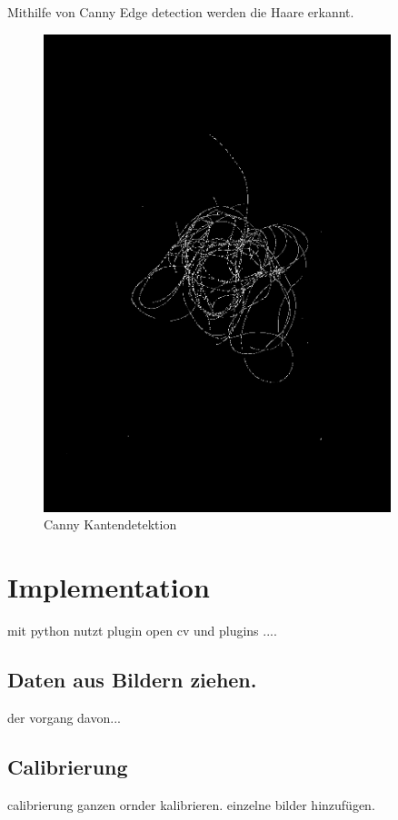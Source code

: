 \documentclass[german,a4paper,12pt]{llncs}
\begin{document}
Mithilfe von Canny Edge detection werden die Haare erkannt.
\begin{figure}
	\centering
	\includegraphics[width=0.9\textwidth]{fig64/04edges.png}
	\caption[]{Canny Kantendetektion}
	\label{img:Crop}
\end{figure}






\section{Implementation}

mit python
nutzt plugin open cv und plugins ....

\subsection{Daten aus Bildern ziehen.}
der vorgang davon...
\subsection{Calibrierung}
calibrierung
ganzen ornder kalibrieren. einzelne bilder hinzufügen.
\end{document}

